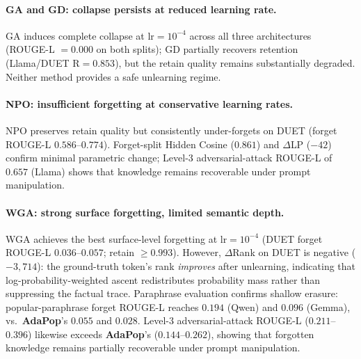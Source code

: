\paragraph{GA and GD: collapse persists at reduced learning rate.}
GA induces complete collapse at $\text{lr}=10^{-4}$ across all three architectures (ROUGE-L $= 0.000$ on both splits); GD partially recovers retention (Llama/DUET R$=0.853$), but the retain quality remains substantially degraded. Neither method provides a safe unlearning regime.

\paragraph{NPO: insufficient forgetting at conservative learning rates.}
NPO preserves retain quality but consistently under-forgets on DUET (forget ROUGE-L $0.586$--$0.774$). Forget-split Hidden Cosine ($0.861$) and $\Delta$LP ($-42$) confirm minimal parametric change; Level-3 adversarial-attack ROUGE-L of $0.657$ (Llama) shows that knowledge remains recoverable under prompt manipulation.

\paragraph{WGA: strong surface forgetting, limited semantic depth.}
WGA achieves the best surface-level forgetting at $\text{lr}=10^{-4}$ (DUET forget ROUGE-L $0.036$--$0.057$; retain $\geq 0.993$). However, $\Delta$Rank on DUET is negative ($-3{,}714$): the ground-truth token's rank \emph{improves} after unlearning, indicating that log-probability-weighted ascent redistributes probability mass rather than suppressing the factual trace. Paraphrase evaluation confirms shallow erasure: popular-paraphrase forget ROUGE-L reaches $0.194$ (Qwen) and $0.096$ (Gemma), vs.\ \textbf{AdaPop}'s $0.055$ and $0.028$. Level-3 adversarial-attack ROUGE-L ($0.211$--$0.396$) likewise exceeds \textbf{AdaPop}'s ($0.144$--$0.262$), showing that forgotten knowledge remains partially recoverable under prompt manipulation.

